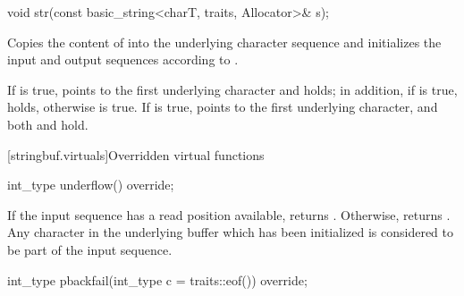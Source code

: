 %
%
\begin{itemdecl}
void str(const basic_string<charT, traits, Allocator>& s);
\end{itemdecl}

\begin{itemdescr}
\pnum
\effects
Copies the content of  into the  underlying character
sequence and initializes the input and output sequences according to .

\pnum
\postconditions If  is true,  points to the
first underlying character and   holds; in
addition, if  is true,
holds, otherwise  is true. If  is
true,  points to the first underlying character, and both  and  hold.
\end{itemdescr}

[stringbuf.virtuals]{Overridden virtual functions}

%
\begin{itemdecl}
int_type underflow() override;
\end{itemdecl}

\begin{itemdescr}
\pnum
\returns
If the input sequence has a read position available,
returns
.
Otherwise, returns
.
Any character in the underlying buffer which has been initialized is considered
to be part of the input sequence. 
\end{itemdescr}

%
\begin{itemdecl}
int_type pbackfail(int_type c = traits::eof()) override;
\end{itemdecl}

